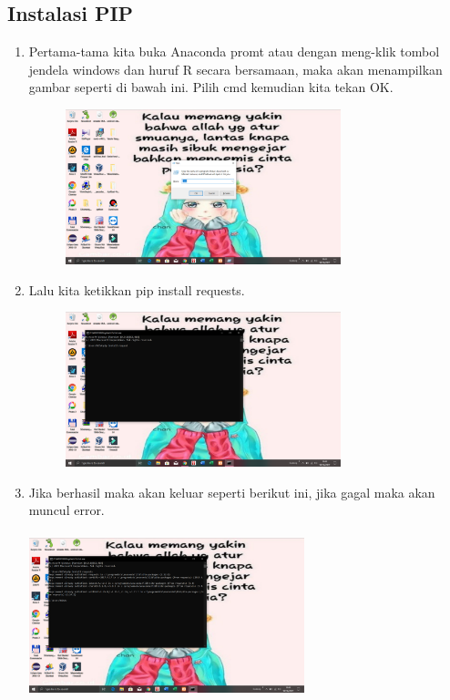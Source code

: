 \documentclass{article}
\begin{document}
\subsection{Instalasi PIP}
\begin{enumerate}
    \item Pertama-tama kita buka Anaconda promt atau dengan meng-klik tombol jendela windows dan huruf R secara bersamaan, maka akan menampilkan gambar seperti di bawah ini. Pilih cmd kemudian kita tekan OK.
        \begin{figure}[h]
            \centerline{\includegraphics[width=8cm]{image/cmd.png}}
        \end{figure}
    \item Lalu kita ketikkan pip install requests.
        \begin{figure}[h]
            \centerline{\includegraphics[width=8cm]{image/pip.png}}
        \end{figure}
    \newpage \item Jika berhasil maka akan keluar seperti berikut ini, jika gagal maka akan muncul error.
            \paragraph{}
            \centerline{\includegraphics[width=8cm]{image/pipberhasil.png}}
\end{enumerate}
\end{document}
